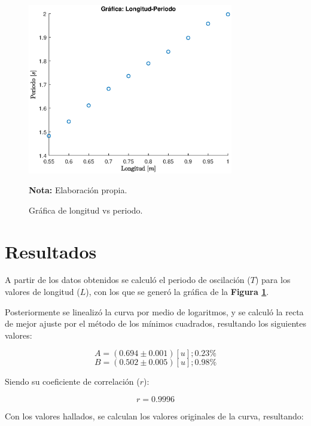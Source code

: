 \documentclass[letter,11pt]{article}
\newcommand{\source}[1]{\vspace{-11pt} \caption*{\small{\textbf{Nota:} {#1}}}}
\begin{document}
\begin{figure}
\centering
\includegraphics[width=0.80\textwidth]{resources/m1.1.eps}
\caption{Gráfica de longitud vs periodo.}
\label{figura3}
\source{Elaboración propia.}
\end{figure}

\section{Resultados}

A partir de los datos obtenidos se calculó el periodo de oscilación ($T$) para
los valores de longitud ($L$), con los que se generó la gráfica de la
\textbf{Figura \ref{figura3}}.

Posteriormente se linealizó la curva por medio de logaritmos, y se calculó la
recta de mejor ajuste por el método de los mínimos cuadrados, resultando los
siguientes valores:

\begin{equation*}
    A = (0.694 \pm 0.001) [u]; 0.23\%
\end{equation*}
\begin{equation*}
    B = (0.502 \pm 0.005) [u]; 0.98\%
\end{equation*}
\vspace{0.10cm}

Siendo su coeficiente de correlación ($r$):

\begin{equation*}
    r = 0.9996
\end{equation*}
\vspace{0.10cm}

Con los valores hallados, se calculan los valores originales de la curva,
resultando:
\end{document}
